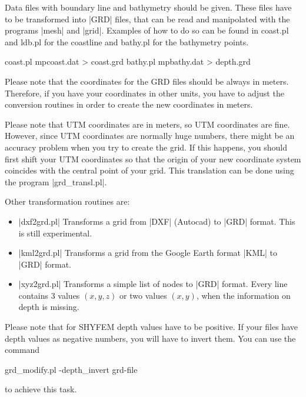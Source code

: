 
Data files with boundary line and bathymetry should be given. These
files have to be transformed into |GRD| files, that can be read and
manipolated with the programs |mesh| and |grid|. Examples of how to do
so can be found in coast.pl and ldb.pl for the coastline and bathy.pl
for the bathymetry points.

\begin{code}
    coast.pl mpcoast.dat > coast.grd
    bathy.pl mpbathy.dat > depth.grd
\end{code}

Please note that the coordinates for the GRD files should be always in
meters. Therefore, if you have your coordinates in other units, you have
to adjust the conversion routines in order to create the new coordinates
in meters.

Please note that UTM coordinates are in meters, so UTM coordinates are
fine. However, since UTM coordinates are normally huge numbers, there
might be an accuracy problem when you try to create the grid. If this
happens, you should first shift your UTM coordinates so that the origin
of your new coordinate system coincides with the central point of your
grid. This translation can be done using the program |grd_transl.pl|.

Other transformation routines are:

\begin{itemize}

\item |dxf2grd.pl|  Transforms a grid from |DXF| (Autocad) to |GRD|
format. This is still experimental.

\item |kml2grd.pl|  Transforms a grid from the Google Earth format |KML|
to |GRD| format.

\item |xyz2grd.pl|  Transforms a simple list of nodes to |GRD|
format. Every line contains 3 values $(x,y,z)$ or two values $(x,y)$,
when the information on depth is missing.

\end{itemize}

Please note that for SHYFEM depth values have to be positive. If your
files have depth values as negative numbers, you will have to invert
them. You can use the command

\begin{code}
    grd_modify.pl -depth_invert grd-file
\end{code}

to achieve this task.

